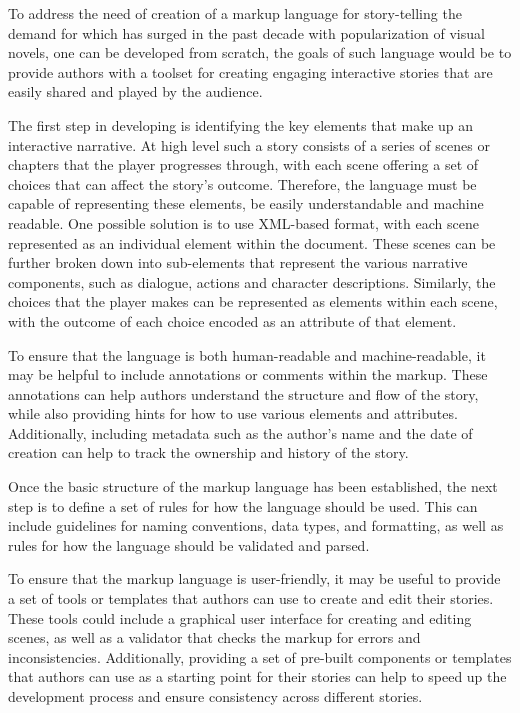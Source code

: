To address the need of creation of a markup language for story-telling the demand for which has surged in the past decade with popularization of visual novels, one can be developed from scratch, the goals of such language would be to provide authors with a toolset for creating engaging interactive stories that are easily shared and played by the audience.

The first step in developing is identifying the key elements that make up an interactive narrative. At high level such a story consists of a series of scenes or chapters that the player progresses through, with each scene offering a set of choices that can affect the story’s outcome. Therefore, the language must be capable of representing these elements, be easily understandable and machine readable.
One possible solution is to use XML-based format, with each scene represented as an individual element within the document. These scenes can be further broken down into sub-elements that represent the various narrative components, such as dialogue, actions and character descriptions. Similarly, the choices that the player makes can be represented as elements within each scene, with the outcome of each choice encoded as an attribute of that element.

To ensure that the language is both human-readable and machine-readable, it may be helpful to include annotations or comments within the markup. These annotations can help authors understand the structure and flow of the story, while also providing hints for how to use various elements and attributes. Additionally, including metadata such as the author's name and the date of creation can help to track the ownership and history of the story.

Once the basic structure of the markup language has been established, the next step is to define a set of rules for how the language should be used. This can include guidelines for naming conventions, data types, and formatting, as well as rules for how the language should be validated and parsed.

To ensure that the markup language is user-friendly, it may be useful to provide a set of tools or templates that authors can use to create and edit their stories. These tools could include a graphical user interface for creating and editing scenes, as well as a validator that checks the markup for errors and inconsistencies. Additionally, providing a set of pre-built components or templates that authors can use as a starting point for their stories can help to speed up the development process and ensure consistency across different stories.

